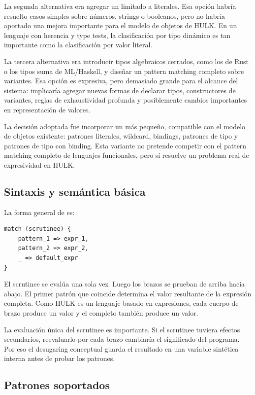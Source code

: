 \documentclass[12pt,letterpaper]{article}
\newcommand{\repo}[1]{\texttt{\detokenize{#1}}}
\newcommand{\hulk}{\textsc{HULK}}
\begin{document}
La segunda alternativa era agregar un \repo{switch} limitado a literales. Esa opción habría resuelto casos simples sobre números, strings o booleanos, pero no habría aportado una mejora importante para el modelo de objetos de \hulk{}. En un lenguaje con herencia y type tests, la clasificación por tipo dinámico es tan importante como la clasificación por valor literal.

La tercera alternativa era introducir tipos algebraicos cerrados, como los \repo{enum} de Rust o los tipos suma de ML/Haskell, y diseñar un pattern matching completo sobre variantes. Esa opción es expresiva, pero demasiado grande para el alcance del sistema: implicaría agregar nuevas formas de declarar tipos, constructores de variantes, reglas de exhaustividad profunda y posiblemente cambios importantes en representación de valores.

La decisión adoptada fue incorporar un \repo{match} más pequeño, compatible con el modelo de objetos existente: patrones literales, wildcard, bindings, patrones de tipo y patrones de tipo con binding. Esta variante no pretende competir con el pattern matching completo de lenguajes funcionales, pero sí resuelve un problema real de expresividad en \hulk{}.

\subsection{Sintaxis y semántica básica}

La forma general de \repo{match} es:

\begin{lstlisting}[language=HULK,caption={Forma general de match}]
match (scrutinee) {
    pattern_1 => expr_1,
    pattern_2 => expr_2,
    _ => default_expr
}
\end{lstlisting}

El scrutinee se evalúa una sola vez. Luego los brazos se prueban de arriba hacia abajo. El primer patrón que coincide determina el valor resultante de la expresión completa. Como \hulk{} es un lenguaje basado en expresiones, cada cuerpo de brazo produce un valor y el \repo{match} completo también produce un valor.

La evaluación única del scrutinee es importante. Si el scrutinee tuviera efectos secundarios, reevaluarlo por cada brazo cambiaría el significado del programa. Por eso el desugaring conceptual guarda el resultado en una variable sintética interna antes de probar los patrones.

\subsection{Patrones soportados}
\end{document}
